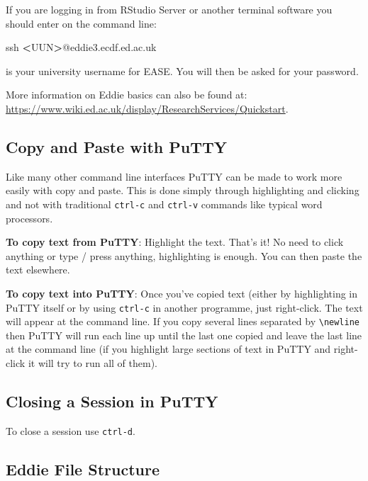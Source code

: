 \documentclass[]{book}
\newenvironment{Shaded}{\begin{snugshade}}{\end{snugshade}}
\newcommand{\FunctionTok}[1]{\textcolor[rgb]{0.00,0.00,0.00}{#1}}
\newcommand{\NormalTok}[1]{#1}
\newcommand{\OperatorTok}[1]{\textcolor[rgb]{0.81,0.36,0.00}{\textbf{#1}}}
\theoremstyle{definition}
\theoremstyle{definition}
\theoremstyle{definition}
\theoremstyle{remark}
\begin{document}
If you are logging in from RStudio Server or another terminal software
you should enter on the command line:

\begin{Shaded}
\begin{Highlighting}[]
\FunctionTok{ssh} \OperatorTok{<}\NormalTok{UUN}\OperatorTok{>}\NormalTok{@eddie3.ecdf.ed.ac.uk}
\end{Highlighting}
\end{Shaded}

 is your university username for EASE. You will then be asked for your
password.

More information on Eddie basics can also be found at:
\url{https://www.wiki.ed.ac.uk/display/ResearchServices/Quickstart}.

\hypertarget{copy-and-paste-with-putty}{%
\subsection{Copy and Paste with PuTTY}\label{copy-and-paste-with-putty}}

Like many other command line interfaces PuTTY can be made to work more
easily with copy and paste. This is done simply through highlighting and
clicking and not with traditional \texttt{ctrl-c} and \texttt{ctrl-v}
commands like typical word processors.

\textbf{To copy text from PuTTY}: Highlight the text. That's it! No need
to click anything or type / press anything, highlighting is enough. You
can then paste the text elsewhere.

\textbf{To copy text into PuTTY}: Once you've copied text (either by
highlighting in PuTTY itself or by using \texttt{ctrl-c} in another
programme, just right-click. The text will appear at the command line.
If you copy several lines separated by \texttt{\textbackslash{}newline}
then PuTTY will run each line up until the last one copied and leave the
last line at the command line (if you highlight large sections of text
in PuTTY and right-click it will try to run all of them).

\hypertarget{closing-a-session-in-putty}{%
\subsection{Closing a Session in
PuTTY}\label{closing-a-session-in-putty}}

To close a session use \texttt{ctrl-d}.

\hypertarget{eddie-file-structure}{%
\subsection{Eddie File Structure}\label{eddie-file-structure}}
\end{document}
